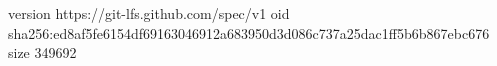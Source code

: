 version https://git-lfs.github.com/spec/v1
oid sha256:ed8af5fe6154df69163046912a683950d3d086c737a25dac1ff5b6b867ebc676
size 349692

